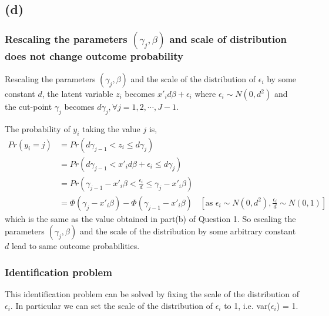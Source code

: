 \documentclass[a4paper]{article}
\begin{document}
\subsection*{(d)}

\subsubsection*{Rescaling the parameters $(\gamma_j,\beta)$ and scale of distribution does not change outcome probability}

Rescaling the parameters $(\gamma_j,\beta)$ and the scale of the distribution of $\epsilon_i$ by some constant $d$, the latent variable $z_i$ becomes $x'_id\beta + \epsilon_i$ where $\epsilon_i \sim N(0,d^2)$ and the cut-point $\gamma_j$ becomes $d\gamma_j, \forall j = 1, 2, \cdots, J-1$.

The probability of $y_i$ taking the value $j$ is,
\begin{align*}
    Pr(y_i=j) &= Pr(d\gamma_{j-1} < z_i \leq d\gamma_j) \\
              &= Pr(d\gamma_{j-1} < x'_i d\beta + \epsilon_i \leq d\gamma_j)\\
              &= Pr(\gamma_{j-1} - x'_i\beta < \frac{\epsilon_i}{d} \leq \gamma_j - x'_i\beta)\\
              &= \Phi(\gamma_j - x'_i\beta) - \Phi(\gamma_{j-1} - x'_i\beta) & [\text{as } \epsilon_i \sim N(0,d^2), \frac{\epsilon_i}{d} \sim N(0,1)]
\end{align*}
which is the same as the value obtained in part(b) of Question 1. So escaling the parameters $(\gamma_j,\beta)$ and the scale of the distribution by some arbitrary constant $d$ lead to same outcome probabilities.

\subsubsection*{Identification problem}
This identification problem can be solved by fixing the scale of the distribution of $\epsilon_i$. In particular we can set the scale of the distribution of $\epsilon_i$ to 1, i.e. var($\epsilon_i$) = 1.

\pagebreak
\end{document}
